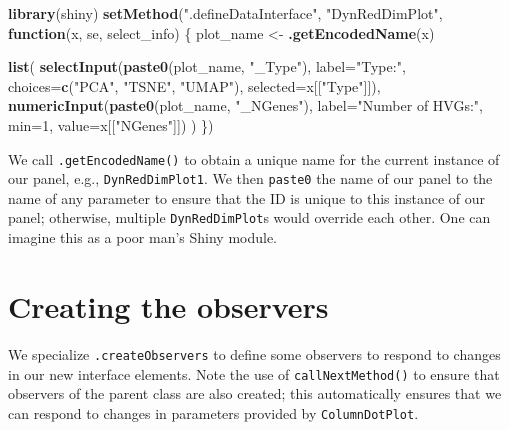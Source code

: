 \documentclass[
]{book}
\newenvironment{Shaded}{\begin{snugshade}}{\end{snugshade}}
\newcommand{\ControlFlowTok}[1]{\textcolor[rgb]{0.13,0.29,0.53}{\textbf{#1}}}
\newcommand{\DataTypeTok}[1]{\textcolor[rgb]{0.13,0.29,0.53}{#1}}
\newcommand{\DecValTok}[1]{\textcolor[rgb]{0.00,0.00,0.81}{#1}}
\newcommand{\KeywordTok}[1]{\textcolor[rgb]{0.13,0.29,0.53}{\textbf{#1}}}
\newcommand{\NormalTok}[1]{#1}
\newcommand{\StringTok}[1]{\textcolor[rgb]{0.31,0.60,0.02}{#1}}
\begin{document}
\begin{Shaded}
\begin{Highlighting}[]
\KeywordTok{library}\NormalTok{(shiny)}
\KeywordTok{setMethod}\NormalTok{(}\StringTok{".defineDataInterface"}\NormalTok{, }\StringTok{"DynRedDimPlot"}\NormalTok{, }\ControlFlowTok{function}\NormalTok{(x, se, select_info) \{}
\NormalTok{    plot_name <-}\StringTok{ }\KeywordTok{.getEncodedName}\NormalTok{(x)}

    \KeywordTok{list}\NormalTok{(}
        \KeywordTok{selectInput}\NormalTok{(}\KeywordTok{paste0}\NormalTok{(plot_name, }\StringTok{"_Type"}\NormalTok{), }\DataTypeTok{label=}\StringTok{"Type:"}\NormalTok{,}
            \DataTypeTok{choices=}\KeywordTok{c}\NormalTok{(}\StringTok{"PCA"}\NormalTok{, }\StringTok{"TSNE"}\NormalTok{, }\StringTok{"UMAP"}\NormalTok{), }\DataTypeTok{selected=}\NormalTok{x[[}\StringTok{"Type"}\NormalTok{]]),}
        \KeywordTok{numericInput}\NormalTok{(}\KeywordTok{paste0}\NormalTok{(plot_name, }\StringTok{"_NGenes"}\NormalTok{), }\DataTypeTok{label=}\StringTok{"Number of HVGs:"}\NormalTok{,}
            \DataTypeTok{min=}\DecValTok{1}\NormalTok{, }\DataTypeTok{value=}\NormalTok{x[[}\StringTok{"NGenes"}\NormalTok{]])}
\NormalTok{    )}
\NormalTok{\})}
\end{Highlighting}
\end{Shaded}

We call \texttt{.getEncodedName()} to obtain a unique name for the current instance of our panel, e.g., \texttt{DynRedDimPlot1}.
We then \texttt{paste0} the name of our panel to the name of any parameter to ensure that the ID is unique to this instance of our panel;
otherwise, multiple \texttt{DynRedDimPlot}s would override each other.
One can imagine this as a poor man's Shiny module.

\hypertarget{creating-the-observers}{%
\section{Creating the observers}\label{creating-the-observers}}

We specialize \texttt{.createObservers} to define some observers to respond to changes in our new interface elements.
Note the use of \texttt{callNextMethod()} to ensure that observers of the parent class are also created;
this automatically ensures that we can respond to changes in parameters provided by \texttt{ColumnDotPlot}.
\end{document}
